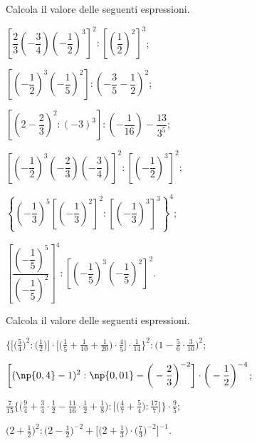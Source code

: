 \begin{esercizio}[\Ast]%
Calcola il valore delle seguenti espressioni.
\begin{multicols}{2}
\begin{enumeratea}
\spazielenx
\item $\left[\dfrac{2}{3}\left(-\dfrac{3}{4}\right)\left(-\dfrac{1}{2}\right)^3\right]^2:\left[\left(\dfrac{1}{2}\right)^2\right]^3$;
\item $\left[\left(-\dfrac{1}{2}\right)^3\left(-\dfrac{1}{5}\right)^2\right]:\left(-\dfrac{3}{5}-\dfrac{1}{2}\right)^2$;
\item $\left[\left(2-\dfrac{2}{3}\right)^2:(-3)^3\right]:\left(-\dfrac{1}{16}\right)-\dfrac{13}{3^5}$;
\item $\left[\left(-\dfrac{1}{2}\right)^3\left(-\dfrac{2}{3}\right)\left(-\dfrac{3}{4}\right)\right]^2:\left[\left(-\dfrac{1}{2}\right)^3\right]^2$;
\item $\left\lbrace\left(-\dfrac{1}{3}\right)^5\left[\left(-\dfrac{1}{3}\right)^2\right]^2:\left[\left(-\dfrac{1}{3}\right)^3\right]^3\right\rbrace^4$;
\item $\left[\dfrac{\left(-\dfrac{1}{5}\right)^5}{\left(-\dfrac{1}{5}\right)^2}\right]^4:\left[\left(-\dfrac{1}{5}\right)^3\left(-\dfrac{1}{5}\right)^2\right]^2$.
\end{enumeratea}
\end{multicols}
\end{esercizio}

\begin{esercizio}[\Ast]%
 Calcola il valore delle seguenti espressioni.
\begin{enumeratea}
\spazielenx
\item $\displaystyle{\bigg\{\bigg[\bigg(\frac{5}{4}\bigg)^{2}:\bigg(\frac{1}{2}\bigg)\bigg]\cdot%
\bigg[\bigg(\frac{1}{5}+\frac{1}{10}+\frac{1}{20}\bigg)\cdot\frac{4}{5}\bigg]\cdot%
\frac{1}{14}\bigg\}^{2}:\bigg(1-\frac{5}{6}\cdot\frac{3}{10}\bigg)^{2}}$;
\item $\displaystyle{\bigg[(\np{0,4}-1)^{2}:\np{0,01}-\bigg(-{\frac{2}{3}}\bigg)^{-2}\bigg]\cdot
\bigg(-{\frac{1}{2}}\bigg)^{-4}}$;
\item $\displaystyle{\frac{7}{15}\bigg\{\bigg(\frac{9}{4}+\frac{3}{4}\cdot
{\frac{1}{2}}-\frac{11}{16}\cdot\frac{1}{2}+\frac{1}{8}\bigg):\bigg[\bigg(\frac{4}{7}+\frac{5}{4}\bigg):\frac{17}{7}\bigg]\bigg\}\cdot
{\frac{9}{5}}}$;
\item $\displaystyle{\bigg(2+\frac{1}{2}\bigg)^{2}:\bigg(2-\frac{1}{2}\bigg)^{-2}+\bigg[\bigg(2+\frac{1}{3}\bigg)\cdot
\bigg(\frac{7}{3}\bigg)^{-2}\bigg]^{-1}}$.
\end{enumeratea}
\end{esercizio}

